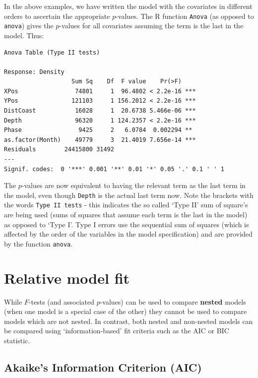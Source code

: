 \documentclass[
  oneside]{krantz}
\begin{document}
In the above examples, we have written the model with the covariates in different orders to ascertain the appropriate \(p\)-values. The R function \texttt{Anova} (as opposed to \texttt{anova}) gives the \(p\)-values for all covariates assuming the term is the last in the model. Thus:

\begin{verbatim}
Anova Table (Type II tests)

Response: Density
                   Sum Sq    Df  F value    Pr(>F)    
XPos                74801     1  96.4802 < 2.2e-16 ***
YPos               121103     1 156.2012 < 2.2e-16 ***
DistCoast           16028     1  20.6738 5.466e-06 ***
Depth               96320     1 124.2357 < 2.2e-16 ***
Phase                9425     2   6.0784  0.002294 ** 
as.factor(Month)    49779     3  21.4019 7.656e-14 ***
Residuals        24415800 31492                       
---
Signif. codes:  0 '***' 0.001 '**' 0.01 '*' 0.05 '.' 0.1 ' ' 1
\end{verbatim}

The \(p\)-values are now equivalent to having the relevant term as the last term in the model, even though \texttt{Depth} is the actual last term now. Note the brackets with the words \texttt{Type\ II\ tests} - this indicates the so called `Type II' sum of square's are being used (sums of squares that assume each term is the last in the model) as opposed to `Type I'. Type I errors use the sequential sum of squares (which is affected by the order of the variables in the model specification) and are provided by the function \texttt{anova}.

\hypertarget{relative-model-fit}{%
\section{Relative model fit}\label{relative-model-fit}}

While \(F\)-tests (and associated \(p\)-values) can be used to compare \textbf{nested} models (when one model is a special case of the other) they cannot be used to compare models which are not nested. In contrast, both nested and non-nested models can be compared using `information-based' fit criteria such as the AIC or BIC statistic.

\hypertarget{akaikes-information-criterion-aic}{%
\subsection{Akaike's Information Criterion (AIC)}\label{akaikes-information-criterion-aic}}
\end{document}
